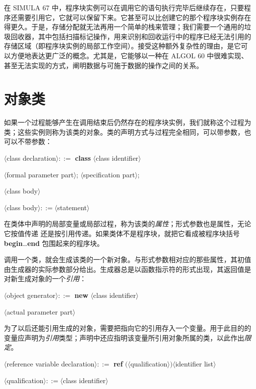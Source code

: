 \documentclass[twoside,11pt,fontset=none]{ctexbook}
\begin{document}
在 SIMULA 67 中，程序块实例可以在调用它的语句执行完毕后继续存在，只要程序还需要引用它，它就可以保留下来。它甚至可以比创建它的那个程序块实例存在得更久。于是，存储分配就无法再用一个简单的栈来管理；我们需要一个通用的垃圾回收器，其中包括扫描标记操作，用来识别和回收运行中的程序已经无法引用的存储区域（即程序块实例的局部工作空间）。接受这种额外复杂性的理由，是它可以方便地表达更广泛的概念。尤其是，它能够以一种在 ALGOL 60 中很难实现、甚至无法实现的方式，阐明数据与可施于数据的操作之间的关系。

\section[对象类]{对象类}

如果一个过程能够产生在调用结束后仍然存在的程序块实例，我们就称这个过程为类；这些实例则称为该类的对象。类的声明方式与过程完全相同，可以带参数，也可以不带参数：

\quad $\langle$class declaration$\rangle ::=$ \textbf{class} $\langle$class identifier$\rangle$

\tabto*{11.6em}$\langle$formal parameter part$\rangle$; $\langle$specification part$\rangle$;

\tabto*{11.6em}$\langle$class body$\rangle$

\quad $\langle$class body$\rangle ::= \langle$statement$\rangle$

在类体中声明的局部变量或局部过程，称为该类的\textit{属性}；形式参数也是属性，无论它按值传递
还是按引用传递。如果类体不是程序块，就把它看成被程序块括号 \textbf{begin}\dots\textbf{end} 包围起来的程序块。

调用一个类，就会生成该类的一个新对象。与形式参数相对应的那些属性，其初值由生成器的实际参数部分给出。生成器总是以函数指示符的形式出现，其返回值是对新生成对象的一个\textit{引用}：

\quad $\langle$object generator$\rangle ::=$ \textbf{new} $\langle$class identifier$\rangle$

\tabto*{11.6em}$\langle$actual parameter part$\rangle$

为了以后还能引用生成的对象，需要把指向它的引用存入一个变量。用于此目的的变量应声明为\textit{引用}类型；声明中还应指明该变量所引用对象所属的类，以此作出\textit{限定}。

\quad $\langle$reference variable declaration$\rangle ::=$ \textbf{ref} $(\langle $qualification$\rangle) \langle$identifier list$\rangle$

\quad $\langle$qualification$\rangle ::= \langle$class identifier$\rangle$
\end{document}
